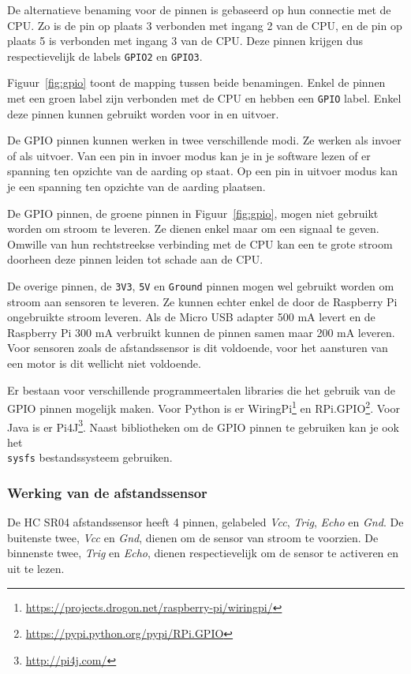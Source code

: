 \documentclass[a4paper]{article}
\begin{document}
      De alternatieve benaming voor de pinnen is gebaseerd op hun
connectie met de CPU.  Zo is de pin op plaats 3 verbonden met ingang 2
van de CPU, en de pin op plaats 5 is verbonden met ingang 3 van de
CPU.  Deze pinnen krijgen dus respectievelijk de labels \texttt{GPIO2}
en \texttt{GPIO3}.

      Figuur~\ref{fig:gpio} toont de mapping tussen beide benamingen.
Enkel de pinnen met een groen label zijn verbonden met de CPU en
hebben een \texttt{GPIO} label.  Enkel deze pinnen kunnen gebruikt
worden voor in en uitvoer.

      De GPIO pinnen kunnen werken in twee verschillende modi.  Ze
werken als invoer of als uitvoer.  Van een pin in invoer modus kan je
in je software lezen of er spanning ten opzichte van de aarding op
staat.  Op een pin in uitvoer modus kan je een spanning ten opzichte
van de aarding plaatsen.

      De GPIO pinnen, de groene pinnen in Figuur~\ref{fig:gpio}, mogen
niet gebruikt worden om stroom te leveren.  Ze dienen enkel maar om
een signaal te geven.  Omwille van hun rechtstreekse verbinding met de
CPU kan een te grote stroom doorheen deze pinnen leiden tot schade aan
de CPU.

      De overige pinnen, de \texttt{3V3}, \texttt{5V} en
\texttt{Ground} pinnen mogen wel gebruikt worden om stroom aan
sensoren te leveren.  Ze kunnen echter enkel de door de Raspberry Pi
ongebruikte stroom leveren.  Als de Micro USB adapter 500 mA levert en
de Raspberry Pi 300 mA verbruikt kunnen de pinnen samen maar 200 mA
leveren.  Voor sensoren zoals de afstandssensor is dit voldoende, voor
het aansturen van een motor is dit wellicht niet voldoende.

      Er bestaan voor verschillende programmeertalen libraries die het
gebruik van de GPIO pinnen mogelijk maken.  Voor Python is er
WiringPi\footnote{\url{https://projects.drogon.net/raspberry-pi/wiringpi/}}
en RPi.GPIO\footnote{\url{https://pypi.python.org/pypi/RPi.GPIO}}.
Voor Java is er Pi4J\footnote{\url{http://pi4j.com/}}. Naast
bibliotheken om de GPIO pinnen te gebruiken kan je ook het
\texttt{\\sysfs} bestandssysteem gebruiken.

    \subsubsection{Werking van de afstandssensor}

      De HC SR04 afstandssensor heeft 4 pinnen, gelabeled \emph{Vcc},
\emph{Trig}, \emph{Echo} en \emph{Gnd}.  De buitenste twee, \emph{Vcc}
en \emph{Gnd}, dienen om de sensor van stroom te voorzien.  De
binnenste twee, \emph{Trig} en \emph{Echo}, dienen respectievelijk om
de sensor te activeren en uit te lezen.
\end{document}
